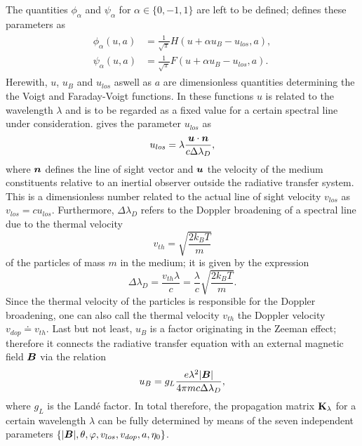 \documentclass[a4paper,11pt]{report}
\begin{document}
The quantities $\phi_\alpha$ and $\psi_\alpha$ for $\alpha \in \{0,-1,1\}$ are left to be defined; \cite[p.123]{delToroIniesta.2003} defines these parameters as \begin{align}
\begin{aligned}
\phi_\alpha(u,a) &= \frac{1}{\sqrt{\pi}}H(u + \alpha u_B - u_{los}, a), \\
\psi_\alpha(u,a) &= \frac{1}{\sqrt{\pi}}F(u + \alpha u_B - u_{los},a).
\end{aligned}
\end{align} Herewith, $u$, $u_B$ and $u_{los}$ aswell as $a$ are dimensionless quantities determining the the Voigt and Faraday-Voigt functions. In these functions $u$ is related to the wavelength $\lambda$ and is to be regarded as a fixed value for a certain spectral line under consideration. \cite[p.21]{UitenbroekNSME.2020} gives the parameter $u_{los}$ as \begin{equation}
u_{los} = \lambda\frac{\bm{u}\cdot\bm{n}}{c\Delta\lambda_D},
\end{equation} where $\bm{n}$ defines the line of sight vector and $\bm{u}$ the velocity of the medium constituents relative to an inertial observer outside the radiative transfer system. This is a dimensionless number related to the actual line of sight velocity $v_{los}$ as $v_{los} = cu_{los}$. Furthermore, $\Delta \lambda_D$ refers to the Doppler broadening of a spectral line due to the thermal velocity \begin{equation}
v_{th} = \sqrt{\frac{2k_BT}{m}}
\end{equation} of the particles of mass $m$ in the medium; it is given by the expression \begin{equation}
\Delta \lambda_D = \frac{v_{th}\lambda}{c} = \frac{\lambda}{c}\sqrt{\frac{2k_B T}{m}}.
\end{equation} Since the thermal velocity of the particles is responsible for the Doppler broadening, one can also call the thermal velocity $v_{th}$ the Doppler velocity $v_{dop} \doteq v_{th}$. Last but not least, $u_B$ is a factor originating in the Zeeman effect; therefore it connects the radiative transfer equation with an external magnetic field $\bm{B}$ via the relation \begin{equation}
u_B = g_L\frac{e\lambda^2|\bm{B}|}{4\pi m c\Delta \lambda_D},
\end{equation} where $g_L$ is the Landé factor. In total therefore, the propagation matrix $\boldsymbol{\mathbf{K}}_\lambda$ for a certain wavelength $\lambda$ can be fully determined by means of the seven independent parameters $\{|\bm{B}|, \theta, \varphi, v_{los}, v_{dop}, a, \eta_0\}$.
\end{document}
